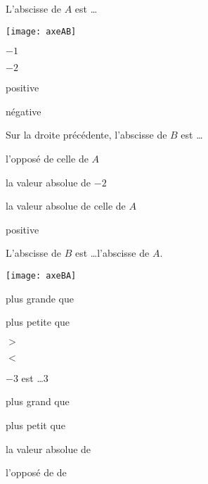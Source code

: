 \begin{QCM}
\begin{GroupeQCM}
    \begin{exercice}
      L'abscisse de $A$ est \ldots 
      
      \qquad \quad  \texttt{[image: axeAB]}
      \begin{ChoixQCM}{4}
      \item $- 1$
      \item $- 2$
      \item positive
      \item négative
      \end{ChoixQCM}
\begin{corrige}
   \end{corrige}
    \end{exercice}
    
    
     \begin{exercice}
      Sur la droite précédente, l'abscisse de $B$ est \ldots
      \begin{ChoixQCM}{4}
      \item l'opposé de celle de $A$
      \item la valeur absolue de $- 2$
      \item la valeur absolue de celle de $A$
      \item positive
      \end{ChoixQCM}
\begin{corrige}
   \end{corrige}
    \end{exercice}
    

    \begin{exercice}
      L'abscisse de $B$ est \ldots l'abscisse de $A$. 
      
      \qquad \qquad \qquad \texttt{[image: axeBA]}
      \begin{ChoixQCM}{4}
      \item plus grande que
      \item plus petite que
      \item $>$
      \item $<$
      \end{ChoixQCM}
\begin{corrige}
   \end{corrige}
    \end{exercice}
    
 
     \begin{exercice}
      $- 3$ est \ldots 3
      \begin{ChoixQCM}{4}
      \item plus grand que
      \item plus petit que
      \item la valeur absolue de
      \item l'opposé de de
      \end{ChoixQCM}
\begin{corrige}
   \end{corrige}
    \end{exercice}
    

\end{GroupeQCM}
\end{QCM}

